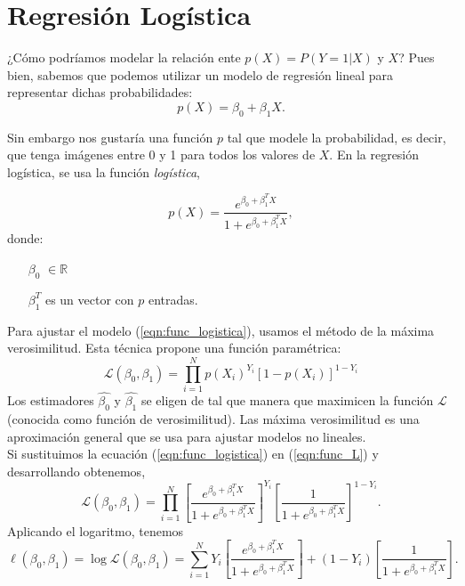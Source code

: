 \documentclass[11pt,letterpaper,reqno]{article}
\begin{document}
\section{Regresión Logística}

¿Cómo podríamos modelar la relación ente $p(X) = P(Y=1|X)$ y $X$? Pues bien, sabemos que podemos utilizar un modelo de regresión lineal para representar dichas probabilidades:
\begin{equation*}
p(X) = \beta_0 + \beta_1X.
\end{equation*}

Sin embargo nos gustaría una función $p$ tal que modele la probabilidad, es decir, que tenga imágenes entre 0 y 1 para todos los valores de $X$. En la regresión logística, se usa la función \textit{logística},

\begin{equation}
	\label{eqn:func_logistica}
	p(X) = \frac{e^{\beta_0 + \beta_1^{T} X}}{1+e^{\beta_0 + \beta_1^{T}X}},
\end{equation}
donde:
\begin{itemize}
	\item[$\beta_0$]$\in \mathbb{R}$
	\item[$\beta_1^T$] es un vector con $p$ entradas.
\end{itemize}
Para ajustar el modelo (\ref{eqn:func_logistica}), usamos el método de la máxima verosimilitud. Esta técnica propone una función paramétrica:
\begin{equation}
	\label{eqn:func_L}
	\mathcal{L}(\beta_{0}, \beta_{1}) = \prod_{i=1}^{N}p(X_i)^{Y_i}[1-p(X_{i})]^{1-Y_i}
\end{equation}
Los estimadores $\hat{\beta_0}$ y $\hat{\beta_1}$ se eligen de tal que manera que maximicen la función $\mathcal{L}$ (conocida como función de verosimilitud). Las máxima verosimilitud es una aproximación general que se usa para ajustar modelos no lineales.\\

Si sustituimos la ecuación (\ref{eqn:func_logistica}) en (\ref{eqn:func_L}) y desarrollando obtenemos,
$$
\mathcal{L}(\beta_{0}, \beta_{1}) =  \prod_{i=1}^{N} \left[ \frac{e^{\beta_0 + \beta_1^{T} X}}{1+e^{\beta_0 + \beta_1^{T}X}} \right]^{Y_i} \left[\frac{1}{1+e^{\beta_0 + \beta_1^{T}X}} \right]^{1-Y_i}.
$$
Aplicando el logaritmo, tenemos
$$
\ell(\beta_{0}, \beta_{1}) = \log\mathcal{L}(\beta_{0}, \beta_{1}) = \sum_{i=1}^{N} Y_i\left[ \frac{e^{\beta_0 + \beta_1^{T} X}}{1+e^{\beta_0 + \beta_1^{T}X}} \right] +  (1-Y_i)\left[\frac{1}{1+e^{\beta_0 + \beta_1^{T}X}} \right].
$$
\end{document}
